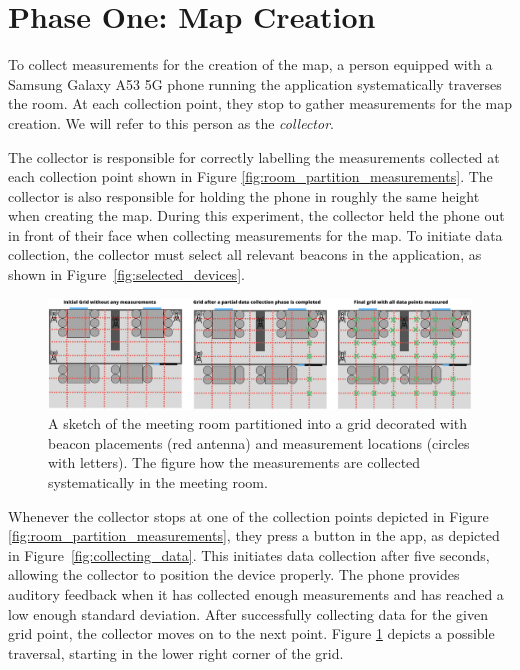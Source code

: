 \section{Phase One: Map Creation}\label{sec:eval_phase1}
To collect measurements for the creation of the map, a person equipped with a Samsung Galaxy A53 5G phone running the application systematically traverses the room. 
At each collection point, they stop to gather measurements for the map creation.
We will refer to this person as the \textit{collector}.

The collector is responsible for correctly labelling the measurements collected at each collection point shown in Figure \ref{fig:room_partition_measurements}. 
The collector is also responsible for holding the phone in roughly the same height when creating the map. 
During this experiment, the collector held the phone out in front of their face when collecting measurements for the map.
To initiate data collection, the collector must select all relevant beacons in the application, as shown in Figure~\ref{fig:selected_devices}.

\begin{figure}[h]
    \centering
    \includegraphics[width=\textwidth]{images/experiment_map_creation.png}
    \caption{A sketch of the meeting room partitioned into a grid decorated with beacon placements (red antenna) and measurement locations (circles with letters). The figure how the measurements are collected systematically in the meeting room.}
    \label{fig:experiment_map_creation}
\end{figure}
Whenever the collector stops at one of the collection points depicted in Figure \ref{fig:room_partition_measurements}, they press a button in the app, as depicted in Figure~\ref{fig:collecting_data}. This initiates data collection after five seconds, allowing the collector to position the device properly.
The phone provides auditory feedback when it has collected enough measurements and has reached a low enough standard deviation.
After successfully collecting data for the given grid point, the collector moves on to the next point.
Figure \ref{fig:experiment_map_creation} depicts a possible traversal, starting in the lower right corner of the grid. 


